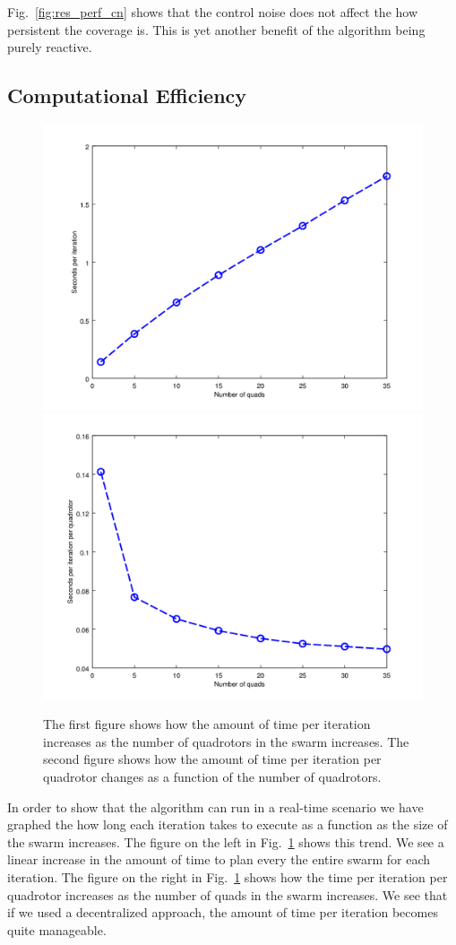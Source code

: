 \documentclass{article}
\begin{document}
Fig.~\ref{fig:res_perf_cn} shows that the control noise does not affect the how
persistent the coverage is. This is yet another benefit of the algorithm being
purely reactive.

\subsection{Computational Efficiency}

\begin{figure}[h!]

    \centering
    \includegraphics[width=0.49\columnwidth]{tasefigs/comp_eff.png}
    \includegraphics[width=0.49\columnwidth]{tasefigs/comp_eff_per_quad.png}

    \caption{The first figure shows how the amount of time per iteration
    increases as the number of quadrotors in the swarm increases. The
    second figure shows how the amount of time per iteration per quadrotor
    changes as a function of the number of quadrotors.}

    \label{fig:comp_eff}

\end{figure}

In order to show that the algorithm can run in a real-time scenario we have
graphed the how long each iteration takes to execute as a function as the size
of the swarm increases. The figure on the left in Fig.~\ref{fig:comp_eff} shows
this trend.  We see a linear increase in the amount of time to plan every the
entire swarm for each iteration. The figure on the right in
Fig.~\ref{fig:comp_eff} shows how the time per iteration per quadrotor
increases as the number of quads in the swarm increases. We see that if we used
a decentralized approach, the amount of time per iteration becomes quite
manageable.
\end{document}
